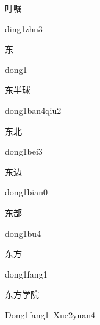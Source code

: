 \begin{verbete}{叮嘱}
\begin{pronuncia}{ding1zhu3}
\end{pronuncia}
\end{verbete}

\begin{verbete}[dong1]{东}
\begin{pronuncia}{dong1}
\end{pronuncia}
\end{verbete}

\begin{verbete}{东半球}
\begin{pronuncia}{dong1ban4qiu2}
\end{pronuncia}
\end{verbete}

\begin{verbete}{东北}
\begin{pronuncia}{dong1bei3}
\end{pronuncia}
\end{verbete}

\begin{verbete}{东边}
\begin{pronuncia}{dong1bian0}
\end{pronuncia}
\end{verbete}

\begin{verbete}[dong1bu4]{东部}
\begin{pronuncia}{dong1bu4}
\end{pronuncia}
\end{verbete}

\begin{verbete}{东方}
\begin{pronuncia}{dong1fang1}
\end{pronuncia}
\end{verbete}

\begin{verbete}{东方学院}
\begin{pronuncia}[\\]{Dong1fang1\ Xue2yuan4}
\end{pronuncia}
\end{verbete}

